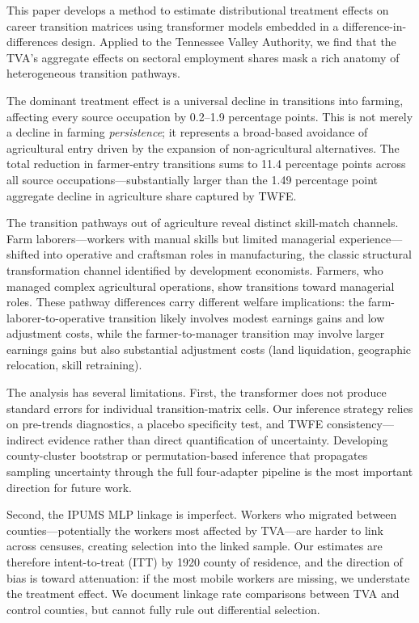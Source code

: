 \documentclass[12pt]{article}
\begin{document}
This paper develops a method to estimate distributional treatment effects on career transition matrices using transformer models embedded in a difference-in-differences design. Applied to the Tennessee Valley Authority, we find that the TVA's aggregate effects on sectoral employment shares mask a rich anatomy of heterogeneous transition pathways.

The dominant treatment effect is a universal decline in transitions into farming, affecting every source occupation by 0.2--1.9 percentage points. This is not merely a decline in farming \textit{persistence}; it represents a broad-based avoidance of agricultural entry driven by the expansion of non-agricultural alternatives. The total reduction in farmer-entry transitions sums to 11.4 percentage points across all source occupations---substantially larger than the 1.49 percentage point aggregate decline in agriculture share captured by TWFE.

The transition pathways out of agriculture reveal distinct skill-match channels. Farm laborers---workers with manual skills but limited managerial experience---shifted into operative and craftsman roles in manufacturing, the classic structural transformation channel identified by development economists. Farmers, who managed complex agricultural operations, show transitions toward managerial roles. These pathway differences carry different welfare implications: the farm-laborer-to-operative transition likely involves modest earnings gains and low adjustment costs, while the farmer-to-manager transition may involve larger earnings gains but also substantial adjustment costs (land liquidation, geographic relocation, skill retraining).

The analysis has several limitations. First, the transformer does not produce standard errors for individual transition-matrix cells. Our inference strategy relies on pre-trends diagnostics, a placebo specificity test, and TWFE consistency---indirect evidence rather than direct quantification of uncertainty. Developing county-cluster bootstrap or permutation-based inference that propagates sampling uncertainty through the full four-adapter pipeline is the most important direction for future work.

Second, the IPUMS MLP linkage is imperfect. Workers who migrated between counties---potentially the workers most affected by TVA---are harder to link across censuses, creating selection into the linked sample. Our estimates are therefore intent-to-treat (ITT) by 1920 county of residence, and the direction of bias is toward attenuation: if the most mobile workers are missing, we understate the treatment effect. We document linkage rate comparisons between TVA and control counties, but cannot fully rule out differential selection.
\end{document}
